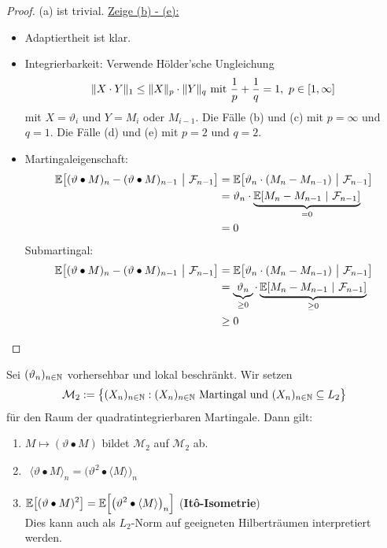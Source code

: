 \begin{proof}
	(a) ist trivial.\nl
	\underline{Zeige (b) - (e):}
	\begin{itemize}
		\item Adaptiertheit ist klar.
		\item Integrierbarkeit: Verwende Hölder'sche Ungleichung
		\begin{align*}
			\Vert X\cdot Y\Vert_1\leq\Vert X\Vert_p\cdot\Vert Y\Vert_q\mit\frac{1}{p}+\frac{1}{q}=1,~p\in[1,\infty]
		\end{align*}
		mit $X=\vartheta_i$ und $Y=M_i$ oder $M_{i-1}$. Die Fälle (b) und (c) mit $p=\infty$ und $q=1$. Die Fälle (d) und (e) mit $p=2$ und $q=2$.
		\item Martingaleigenschaft:
		\begin{align*}
			\E\big[(\vartheta\bullet M)_n-(\vartheta\bullet M)_{n-1}~\big|~\F_{n-1}\big]
			&=\E\big[\vartheta_n\cdot(M_n-M_{n-1})~\big|~\F_{n-1}\big]\\
			&=\vartheta_n\cdot\underbrace{\E[M_n-M_{n-1}~|~\F_{n-1}]}_{=0}\\
			&=0
		\end{align*}
		Submartingal:
		\begin{align*}
			\E\big[(\vartheta\bullet M)_n-(\vartheta\bullet M)_{n-1}~\big|~\F_{n-1}\big]
			&=\E\big[\vartheta_n\cdot(M_n-M_{n-1})~\big|~\F_{n-1}\big]\\
			&=\underbrace{\vartheta_n}_{\geq0}\cdot\underbrace{\E[M_n-M_{n-1}~|~\F_{n-1}]}_{\geq0}\\
			&\geq0
		\end{align*}
	\end{itemize}
\end{proof}

\begin{proposition}\label{prop2.6}
	Sei $(\vartheta_n)_{n\in\N}$ vorhersehbar und lokal beschränkt. Wir setzen
	\begin{align*}
		\mathcal{M}_2:=\big\lbrace (X_n)_{n\in\N}:(X_n)_{n\in\N}\text{ Martingal und }(X_n)_{n\in\N}\subseteq L_2\big\rbrace
	\end{align*}
	für den Raum der quadratintegrierbaren Martingale. Dann gilt:
	\begin{enumerate}[label=(\alph*)]
		\item $M\mapsto(\vartheta\bullet M)$ bildet $\mathcal{M}_2$ auf $\mathcal{M}_2$ ab.
		\item $\begin{aligned}
			\langle\vartheta\bullet M\rangle_n=\big(\vartheta^2\bullet\langle M\rangle\big)_n
		\end{aligned}$
		\item $\begin{aligned}
			\E\big[(\vartheta\bullet M)^2\big]=\E\Big[\big(\vartheta^2\bullet\langle M\rangle\big)_n\Big]
		\end{aligned}$ (\textbf{It\^o-Isometrie})\\
		Dies kann auch als $L_2$-Norm auf geeigneten Hilberträumen interpretiert werden.
	\end{enumerate}
\end{proposition}


